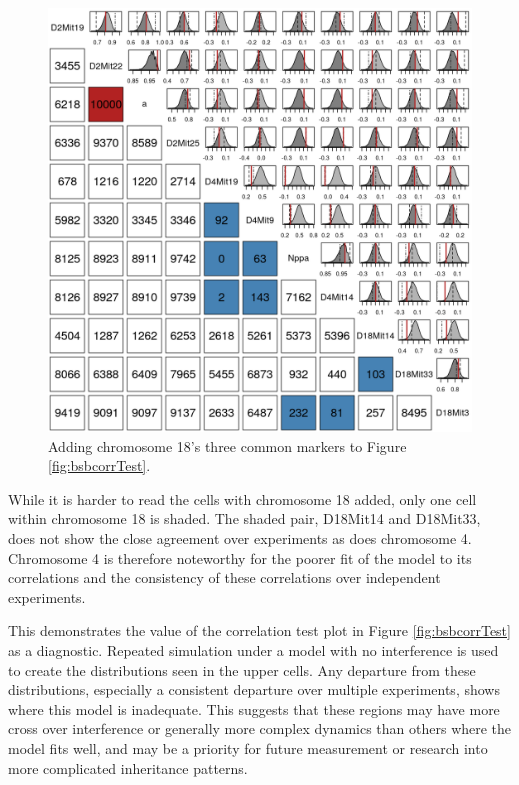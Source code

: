 \documentclass[12pt]{article}
\begin{document}
\begin{figure}[htp]
  \begin{center}
      \includegraphics[scale = 0.5]{../img/bsbCorrTestBig.png}
  \end{center}
  \caption{Adding chromosome 18's three common markers to Figure \ref{fig:bsbcorrTest}.}
  \label{fig:bsbcorrTestBig}
\end{figure}

While it is harder to read the cells with chromosome 18 added, only one cell within chromosome 18 is shaded. The shaded pair, D18Mit14 and D18Mit33, does not show the close agreement over experiments as does chromosome 4. Chromosome 4 is therefore noteworthy for the poorer fit of the model to its correlations and the consistency of these correlations over independent experiments.

This demonstrates the value of the correlation test plot in Figure \ref{fig:bsbcorrTest} as a diagnostic. Repeated simulation under a model with no interference is used to create the distributions seen in the upper cells. Any departure from these distributions, especially a consistent departure over multiple experiments, shows where this model is inadequate. This suggests that these regions may have more cross over interference or generally more complex dynamics than others where the model fits well, and may be a priority for future measurement or research into more complicated inheritance patterns.
\end{document}
